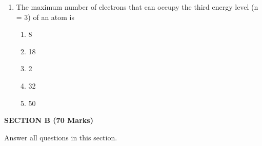 \documentclass[12pt]{article}
\newcommand{\centerheading}[1]{
    \vspace{0.6em}
    \begin{center}
        {\fontsize{13}{15}\selectfont\bfseries #1}
    \end{center}
    \vspace{0.15em}
}
\newenvironment{questionblock}[1][10]{
    \par\Needspace{#1\baselineskip}
}{
    \par
}
\begin{document}
\begin{enumerate}
\begin{enumerate}[label=(\roman*)]
    \begin{questionblock}
      \item The maximum number of electrons that can occupy the third energy level (n = 3) of an atom is
      \begin{enumerate}[label=\Alph*.]
        \item 8
        \item 18
        \item 2
        \item 32
        \item 50
      \end{enumerate}
      \vspace{0.8em}
    \end{questionblock}

  \end{enumerate}

\end{enumerate}

\centerheading{SECTION B (70 Marks)}
\vspace{-2.0em}
\begin{center}
  Answer all questions in this section.
\end{center}
\vspace{-2.0em}
\end{document}
